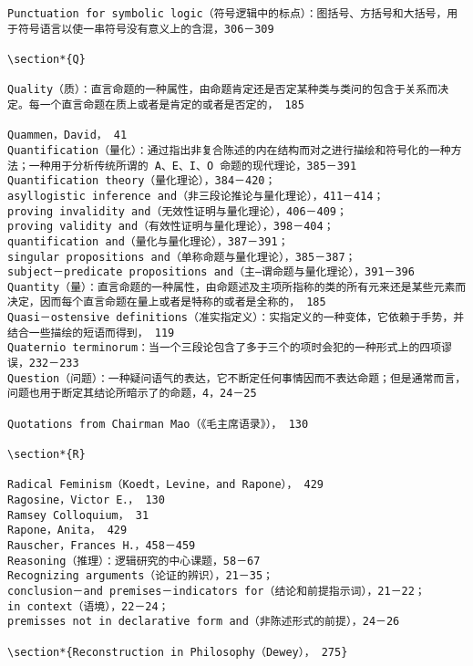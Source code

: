 \begin{verbatim}
Punctuation for symbolic logic（符号逻辑中的标点）：图括号、方括号和大括号，用于符号语言以使一串符号没有意义上的含混，306－309

\section*{Q}

Quality（质）：直言命题的一种属性，由命题肯定还是否定某种类与类问的包含于关系而决定。每一个直言命题在质上或者是肯定的或者是否定的， 185

Quammen，David， 41
Quantification（量化）：通过指出非复合陈述的内在结构而对之进行描绘和符号化的一种方法；一种用于分析传统所谓的 A、E、I、O 命题的现代理论，385－391
Quantification theory（量化理论），384－420；
asyllogistic inference and（非三段论推论与量化理论），411－414；
proving invalidity and（无效性证明与量化理论），406－409；
proving validity and（有效性证明与量化理论），398－404；
quantification and（量化与量化理论），387－391；
singular propositions and（单称命题与量化理论），385－387；
subject－predicate propositions and（主—谓命题与量化理论），391－396
Quantity（量）：直言命题的一种属性，由命题述及主项所指称的类的所有元来还是某些元素而决定，因而每个直言命题在量上或者是特称的或者是全称的， 185
Quasi－ostensive definitions（准实指定义）：实指定义的一种变体，它依赖于手势，并结合一些描绘的短语而得到， 119
Quaternio terminorum：当一个三段论包含了多于三个的项时会犯的一种形式上的四项谬误，232－233
Question（问题）：一种疑问语气的表达，它不断定任何事情因而不表达命题；但是通常而言，问题也用于断定其结论所暗示了的命题，4，24－25

Quotations from Chairman Mao（《毛主席语录》）， 130

\section*{R}

Radical Feminism（Koedt，Levine，and Rapone）， 429
Ragosine，Victor E．， 130
Ramsey Colloquium， 31
Rapone，Anita， 429
Rauscher，Frances H．，458－459
Reasoning（推理）：逻辑研究的中心课题，58－67
Recognizing arguments（论证的辨识），21－35；
conclusion－and premises－indicators for（结论和前提指示词），21－22；
in context（语境），22－24；
premisses not in declarative form and（非陈述形式的前提），24－26

\section*{Reconstruction in Philosophy（Dewey）， 275}


\end{verbatim}
